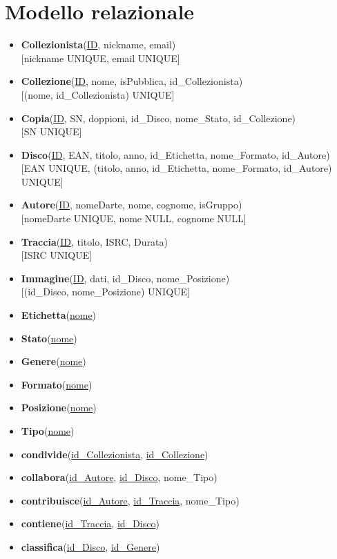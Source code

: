 \documentclass{article}
\begin{document}
\section{Modello relazionale}
\begin{itemize}
    \item \textbf{Collezionista}(\underline{ID}, nickname, email)
          \\[3pt] \textnormal{[nickname UNIQUE, email UNIQUE]}
    \item \textbf{Collezione}(\underline{ID}, nome, isPubblica, id\_Collezionista)
          \\[3pt] \textnormal{[(nome, id\_Collezionista) UNIQUE]}
    \item \textbf{Copia}(\underline{ID}, SN, doppioni, id\_Disco, nome\_Stato, id\_Collezione)
          \\[3pt] \textnormal{[SN UNIQUE]}
    \item \textbf{Disco}(\underline{ID}, EAN, titolo, anno, id\_Etichetta, nome\_Formato, id\_Autore)
          \\[3pt] \textnormal{[EAN UNIQUE, (titolo, anno, id\_Etichetta, nome\_Formato, id\_Autore) UNIQUE]}
    \item \textbf{Autore}(\underline{ID}, nomeDarte, nome, cognome, isGruppo)
          \\[3pt] \textnormal{[nomeDarte UNIQUE, nome NULL, cognome NULL]}
    \item \textbf{Traccia}(\underline{ID}, titolo, ISRC, Durata)
          \\[3pt] \textnormal{[ISRC UNIQUE]}
    \item \textbf{Immagine}(\underline{ID}, dati, id\_Disco, nome\_Posizione)
          \\[3pt] \textnormal{[(id\_Disco, nome\_Posizione) UNIQUE]}
    \item \textbf{Etichetta}(\underline{nome})
    \item \textbf{Stato}(\underline{nome})
    \item \textbf{Genere}(\underline{nome})
    \item \textbf{Formato}(\underline{nome})
    \item \textbf{Posizione}(\underline{nome})
    \item \textbf{Tipo}(\underline{nome})
    \item \textbf{condivide}(\underline{id\_Collezionista}, \underline{id\_Collezione})
    \item \textbf{collabora}(\underline{id\_Autore}, \underline{id\_Disco}, nome\_Tipo)
    \item \textbf{contribuisce}(\underline{id\_Autore}, \underline{id\_Traccia}, nome\_Tipo)
    \item \textbf{contiene}(\underline{id\_Traccia}, \underline{id\_Disco})
    \item \textbf{classifica}(\underline{id\_Disco}, \underline{id\_Genere})
\end{itemize}
\end{document}
